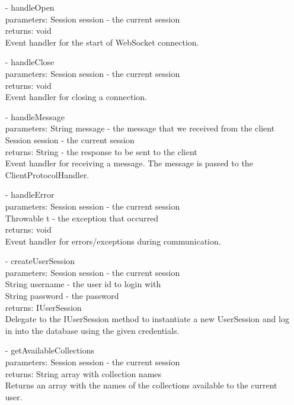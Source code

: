 \documentclass[oneside, english, final]{design}
\begin{document}
\begin{itemize}
\begin{itemize}
		      \item[-]handleOpen
		            \\parameters: Session session - the current session
		            \\returns: void
		            \\Event handler for the start of WebSocket connection.
		      \item[-]handleClose
		            \\parameters: Session session - the current session
		            \\returns: void
		            \\Event handler for closing a connection.

		      \item[-]handleMessage
		            \\parameters: String message - the message that we received from the client
		            \\Session session - the current session
		            \\returns: String - the response to be sent to the client
		            \\Event handler for receiving a message. The message is passed to the ClientProtocolHandler.

		      \item[-]handleError
		            \\parameters: Session session - the current session
		            \\Throwable t - the exception that occurred
		            \\returns: void
		            \\Event handler for errors/exceptions during communication.
		      \item[-]createUserSession
		            \\parameters: Session session - the current session
		            \\String username - the user id to login with
		            \\String password - the password
		            \\returns: IUserSession
		            \\Delegate to the IUserSession method to instantiate a new UserSession and log in into the database using the given credentials.

		      \item[-]getAvailableCollections
		            \\parameters: Session session - the current session
		            \\returns: String array with collection names
		            \\Returns an array with the names of the collections available to the current user.


\end{itemize}
\end{itemize}
\end{document}
